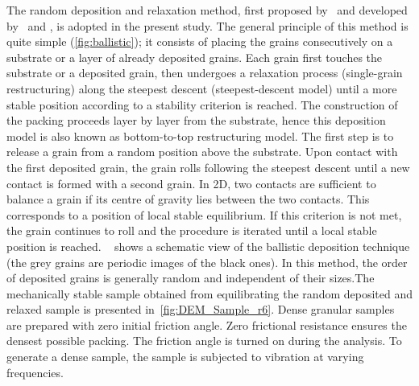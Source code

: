 The random deposition and 
relaxation method, first proposed by~\citet{vold1959a} and developed 
by~\citet{jullien1992} and \citet{meakin1985}, is adopted in the present study. 
The general principle of this method is quite simple 
(\cref{fig:ballistic}); it consists of placing the grains consecutively on 
a substrate or a layer of already deposited grains. Each grain first 
touches the substrate or a deposited grain, then undergoes a relaxation process 
(single-grain restructuring) along the steepest descent (steepest-descent 
model) until a more stable position according to a stability criterion is 
reached. The construction of the packing proceeds layer by layer from the 
substrate, hence this deposition model is also known as bottom-to-top 
restructuring model. The first step is to release a grain from a random 
position above the substrate. Upon contact with the first deposited grain, the 
grain rolls following the steepest descent until a new contact is formed with a 
second grain. In 2D, two contacts are sufficient to balance a grain if its 
centre of gravity lies between the two contacts. This corresponds to a position 
of local stable equilibrium. If this criterion is not met, the grain continues 
to roll and the procedure is iterated until a local stable position is reached. 
~ shows a schematic view of the ballistic deposition 
technique  (the grey grains are periodic images of the black ones). In this 
method, the order of deposited grains is generally random and independent of 
their sizes.The mechanically stable sample obtained from equilibrating the 
random deposited and relaxed sample is presented in~\cref{fig:DEM_Sample_r6}. 
Dense granular samples are prepared with zero initial friction angle. Zero 
frictional resistance ensures the densest possible packing. The friction angle 
is turned on during the analysis. To generate a dense sample, the sample is 
subjected to vibration at varying frequencies. 

